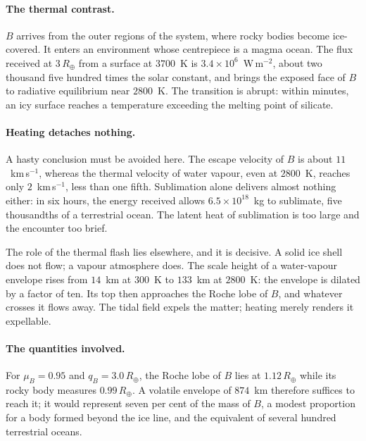 \documentclass[11pt,a4paper,openany]{report}
\newcommand{\Rt}{R_{\oplus}}
\begin{document}
\paragraph{The thermal contrast.} $B$ arrives from the outer regions of the system, where rocky
bodies become ice-covered. It enters an environment whose centrepiece is a magma ocean. The flux
received at $3\,\Rt$ from a surface at $3700$~K is $3.4\times10^{6}$~W\,m$^{-2}$, about two thousand
five hundred times the solar constant, and brings the exposed face of $B$ to radiative equilibrium
near $2800$~K. The transition is abrupt: within minutes, an icy surface reaches a temperature
exceeding the melting point of silicate.

\paragraph{Heating detaches nothing.} A hasty conclusion must be avoided here. The escape velocity
of $B$ is about $11$~km\,s$^{-1}$, whereas the thermal velocity of water vapour, even at $2800$~K,
reaches only $2$~km\,s$^{-1}$, less than one fifth. Sublimation alone delivers almost nothing
either: in six hours, the energy received allows $6.5\times10^{18}$~kg to sublimate, five thousandths
of a terrestrial ocean. The latent heat of sublimation is too large and the encounter too brief.

\begin{ideephys}
The role of the thermal flash lies elsewhere, and it is decisive. A solid ice shell does not flow; a
vapour atmosphere does. The scale height of a water-vapour envelope rises from $14$~km at $300$~K to
$133$~km at $2800$~K: the envelope is dilated by a factor of ten. Its top then approaches the Roche
lobe of $B$, and whatever crosses it flows away. The tidal field expels the matter; heating merely
renders it expellable.
\end{ideephys}

\paragraph{The quantities involved.} For $\mu_B=0.95$ and $q_B=3.0\,\Rt$, the Roche lobe of $B$ lies
at $1.12\,\Rt$ while its rocky body measures $0.99\,\Rt$. A volatile envelope of $874$~km therefore
suffices to reach it; it would represent seven per cent of the mass of $B$, a modest proportion for
a body formed beyond the ice line, and the equivalent of several hundred terrestrial oceans.
\end{document}
